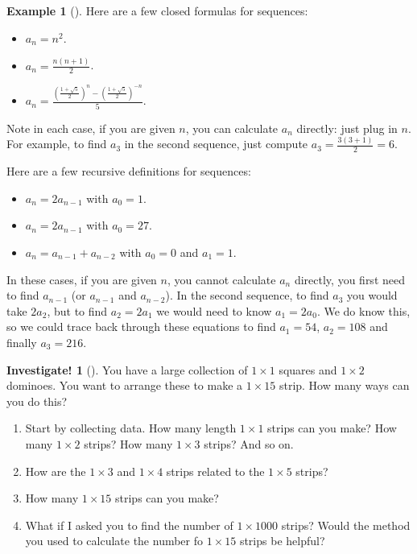 \documentclass[10pt,]{book}
\theoremstyle{plain}
\theoremstyle{definition}
\theoremstyle{definition}
\newtheorem{example}[theorem]{Example}
\theoremstyle{definition}
\newtheorem{investigation}[project]{Investigate!}
\theoremstyle{definition}
\numberwithin{equation}{chapter}
\renewcommand{\d}{\displaystyle}
\begin{document}
\begin{example}[]\label{example-2}
\hypertarget{p-46}{}%
Here are a few closed formulas for sequences: \leavevmode%
\begin{itemize}[label=\textbullet]
\item{}\(a_n = n^2\).%
\item{}\(\d a_n = \frac{n(n+1)}{2}\).%
\item{}\(\d a_n = \frac{\left(\frac{1 + \sqrt 5}{2}\right)^n - \left(\frac{1 + \sqrt 5}{2}\right)^{-n}}{5}\).%
\end{itemize}
%
\par
\hypertarget{p-47}{}%
Note in each case, if you are given \(n\), you can calculate \(a_n\) directly: just plug in \(n\).  For example, to find \(a_3\) in the second sequence, just compute \(a_3 = \frac{3(3+1)}{2} = 6\).%
\par
\hypertarget{p-48}{}%
Here are a few recursive definitions for sequences: \leavevmode%
\begin{itemize}[label=\textbullet]
\item{}\(a_n = 2a_{n-1}\) with \(a_0 = 1\).%
\item{}\(a_n = 2a_{n-1}\) with \(a_0 = 27\).%
\item{}\(a_n = a_{n-1} + a_{n-2}\) with \(a_0 = 0\) and \(a_1 = 1\).%
\end{itemize}
%
\par
\hypertarget{p-49}{}%
In these cases, if you are given \(n\), you cannot calculate \(a_n\) directly, you first need to find \(a_{n-1}\) (or \(a_{n-1}\) and \(a_{n-2}\)). In the second sequence, to find \(a_3\) you would take \(2a_2\), but to find \(a_2 = 2a_1\) we would need to know \(a_1 = 2a_0\).  We do know this, so we could trace back through these equations to find \(a_1 = 54\), \(a_2 = 108\) and finally \(a_3 = 216\).%
\end{example}
\begin{investigation}[]\label{investigation-3}
\hypertarget{p-50}{}%
You have a large collection of \(1\times 1\) squares and \(1\times 2\) dominoes. You want to arrange these to make a \(1 \times 15\) strip. How many ways can you do this? %
\begin{enumerate}
\item\hypertarget{li-34}{}\hypertarget{p-51}{}%
Start by collecting data. How many length \(1\times 1\) strips can you make? How many \(1\times 2\) strips? How many \(1\times 3\) strips? And so on.%
\item\hypertarget{li-35}{}\hypertarget{p-52}{}%
How are the \(1\times 3\) and \(1 \times 4\) strips related to the \(1\times 5\) strips?%
\item\hypertarget{li-36}{}\hypertarget{p-53}{}%
How many \(1\times 15\) strips can you make?%
\item\hypertarget{li-37}{}\hypertarget{p-54}{}%
What if I asked you to find the number of \(1\times 1000\) strips? Would the method you used to calculate the number fo \(1 \times 15\) strips be helpful?%
\end{enumerate}
%
\end{investigation}
\end{document}
